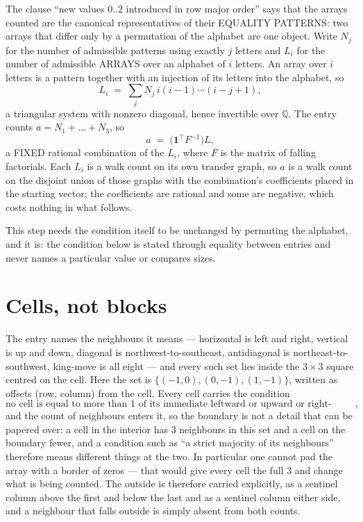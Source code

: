 \documentclass[11pt,a4paper]{article}
\theoremstyle{plain}
\theoremstyle{definition}
\begin{document}
The clause ``new values $0..2$ introduced in row major order'' says that the arrays
counted are the canonical representatives of their EQUALITY PATTERNS: two arrays that differ
only by a permutation of the alphabet are one object. Write $N_j$ for the number of admissible
patterns using exactly $j$ letters and $L_i$ for the number of admissible ARRAYS over an
alphabet of $i$ letters. An array over $i$ letters is a pattern together with an injection of
its letters into the alphabet, so
\[
L_i\;=\;\sum_{j}N_j\,i(i-1)\cdots(i-j+1),
\]
a triangular system with nonzero diagonal, hence invertible over $\mathbb{Q}$. The entry
counts $a=N_1+\dots+N_{3}$, so
\[
a\;=\;\bigl(\mathbf{1}^{\!\top}F^{-1}\bigr)L ,
\]
a FIXED rational combination of the $L_i$, where $F$ is the matrix of falling factorials.
Each $L_i$ is a walk count on its own transfer graph, so $a$ is a walk count on the disjoint
union of those graphs with the combination's coefficients placed in the starting vector; the
coefficients are rational and some are negative, which costs nothing in what follows.

This step needs the condition itself to be unchanged by permuting the alphabet, and it is:
the condition below is stated through equality between entries and never names a particular
value or compares sizes.

\section{Cells, not blocks}

The entry names the neighbours it means --- horizontal is left and right, vertical is up and
down, diagonal is northwest-to-southeast, antidiagonal is northeast-to-southwest, king-move is
all eight --- and every such set lies inside the $3\times3$ square centred on the cell. Here
the set is $\{(-1,0), (0,-1), (1,-1)\}$, written as offsets (row, column) from the cell. Every cell carries
the condition
\[
\text{no cell is equal to more than 1 of its immediate leftward or upward or right-upward antidiagonal neighbours},
\]
and the count of neighbours enters it, so the boundary is not a detail that can be papered
over: a cell in the interior has $3$ neighbours in this set and a cell on the boundary
fewer, and a condition such as ``a strict majority of its neighbours'' therefore means
different things at the two. In particular one cannot pad the array with a border of zeros ---
that would give every cell the full $3$ and change what is being counted. The outside is
therefore carried
explicitly, as a sentinel column above the first and below the last and as a sentinel column
either side, and a neighbour that falls outside is simply absent from both counts.
\end{document}
